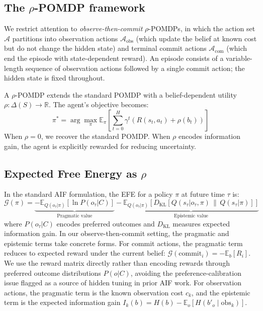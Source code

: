 \documentclass[runningheads]{llncs}
\begin{document}
\subsection{The $\rho$-POMDP framework}

We restrict attention to \emph{observe-then-commit} $\rho$-POMDPs, in which the action set $\mathcal{A}$ partitions into observation actions $\mathcal{A}_\text{obs}$ (which update the belief at known cost but do not change the hidden state) and terminal commit actions $\mathcal{A}_\text{com}$ (which end the episode with state-dependent reward). An episode consists of a variable-length sequence of observation actions followed by a single commit action; the hidden state is fixed throughout.

A $\rho$-POMDP extends the standard POMDP with a belief-dependent utility $\rho : \Delta(S) \rightarrow \mathbb{R}$. The agent's objective becomes:
\begin{equation}
    \pi^* = \arg\max_\pi \mathbb{E}_\pi \left[ \sum_{t=0}^{H} \gamma^t \left( R(s_t, a_t) + \rho(b_t) \right) \right]
\end{equation}
When $\rho = 0$, we recover the standard POMDP. When $\rho$ encodes information gain, the agent is explicitly rewarded for reducing uncertainty.

\subsection{Expected Free Energy as $\rho$}

In the standard AIF formulation, the EFE for a policy $\pi$ at future time $\tau$ is:
\begin{equation}
    \mathcal{G}(\pi) = \underbrace{- \mathbb{E}_{Q(o_\tau|\pi)}[\ln P(o_\tau|C)]}_{\text{Pragmatic value}} - \underbrace{\mathbb{E}_{Q(o_\tau|\pi)}\left[D_{\mathrm{KL}}\left[Q(s_\tau|o_\tau, \pi) \,\|\, Q(s_\tau|\pi)\right]\right]}_{\text{Epistemic value}}
\end{equation}
where $P(o_\tau|C)$ encodes preferred outcomes and $D_{\mathrm{KL}}$ measures expected information gain. In our observe-then-commit setting, the pragmatic and epistemic terms take concrete forms. For commit actions, the pragmatic term reduces to expected reward under the current belief: $\mathcal{G}(\text{commit}_i) = -\mathbb{E}_b[R_i]$. We use the reward matrix directly rather than encoding rewards through preferred outcome distributions $P(o|C)$, avoiding the preference-calibration issue flagged as a source of hidden tuning in prior AIF work. For observation actions, the pragmatic term is the known observation cost $c_k$, and the epistemic term is the expected information gain $I_k(b) = H(b) - \mathbb{E}_o[H(b'_o \mid \text{obs}_k)]$.
\end{document}
